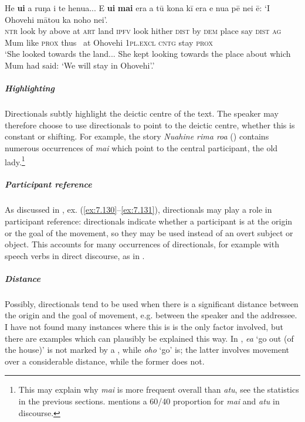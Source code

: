 \ea\label{ex:7.152}
\gll He \textbf{u{\ꞌ}i} a ruŋa i te henua... E \textbf{u{\ꞌ}i} \textbf{mai} era a tū kona kī era  e nua pē nei ē: ‘{\ꞌ}I {\ꞌ}Ohovehi mātou ka noho nei’.\\
\textsc{ntr} look by above at \textsc{art} land \textsc{ipfv} look hither \textsc{dist} by \textsc{dem} place say \textsc{dist}  \textsc{ag} Mum like \textsc{prox} thus ~at Ohovehi \textsc{1pl.excl} \textsc{cntg} stay \textsc{prox}\\

\glt
‘She looked towards the land... She kept looking towards the place about which Mum had said: ‘We will stay in Ohovehi’.’ \textstyleExampleref{[R210.082–083]}
\z

\subparagraph{Highlighting} Directionals subtly highlight the deictic centre of the text. The speaker may therefore choose to use directionals to point to the deictic centre, whether this is constant or shifting. For example, the story \textit{Nuahine rima roa} () contains numerous occurrences of \textit{mai} which point to the central participant, the old lady.\footnote{\label{fn:368}This may explain why \textit{mai} is more frequent overall than \textit{atu}, see the statistics in the previous sections. \citet[1742]{Hooper2004} mentions a 60/40 proportion for \textit{mai} and \textit{atu} in  discourse.}

\subparagraph{Participant reference} As discussed in , ex. (\ref{ex:7.130}–\ref{ex:7.131}), directionals may play a role in participant reference: directionals indicate whether a participant is at the origin or the goal of the movement, so they may be used instead of an overt subject or object. This accounts for many occurrences of directionals, for example with speech verbs in direct discourse, as in .

\subparagraph{Distance} Possibly, directionals tend to be used when there is a significant distance between the origin and the goal of movement, e.g. between the speaker and the addressee. I have not found many instances where this is is the only factor involved, but there are examples which can plausibly be explained this way. In , \textit{e{\ꞌ}a} ‘go out (of the house)’ is not marked by a , while \textit{oho} ‘go’ is; the latter involves movement over a considerable distance, while the former does not. 

